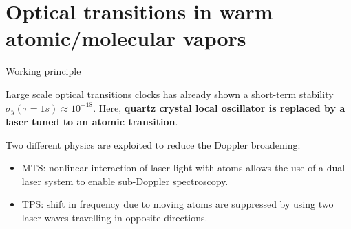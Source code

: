 \section*{Optical transitions in warm atomic/molecular vapors}

\begin{frame}{Working principle}

    Large scale optical transitions clocks has already shown a short-term stability $\sigma_y(\tau = 1s) \approx 10^{-18}$.
    Here, \textbf{quartz crystal local oscillator is replaced by a laser tuned to an atomic transition}.

    \vspace{10pt}

    Two different physics are exploited to reduce the Doppler broadening:

    \begin{itemize}
        \item MTS\footnotemark[1]: nonlinear interaction of laser light with atoms allows the use of a dual laser system to enable sub-Doppler spectroscopy.
        \item TPS\footnotemark[2]: shift in frequency due to moving atoms are suppressed by using two laser waves travelling in opposite directions.
    \end{itemize}


\end{frame}



